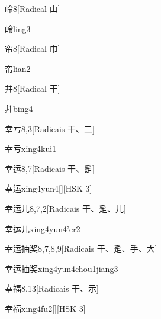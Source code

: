 \begin{entry}{岭}{8}[Radical ⼭]
  \begin{phonetics}{岭}{ling3}
  \end{phonetics}
\end{entry}

\begin{entry}{帘}{8}[Radical ⼱]
  \begin{phonetics}{帘}{lian2}
  \end{phonetics}
\end{entry}

\begin{entry}{幷}{8}[Radical ⼲]
  \begin{phonetics}{幷}{bing4}
  \end{phonetics}
\end{entry}

\begin{entry}{幸亏}{8,3}[Radicais ⼲、⼆]
  \begin{phonetics}{幸亏}{xing4kui1}
  \end{phonetics}
\end{entry}

\begin{entry}{幸运}{8,7}[Radicais ⼲、⾡]
  \begin{phonetics}{幸运}{xing4yun4}[][HSK 3]
  \end{phonetics}
\end{entry}

\begin{entry}{幸运儿}{8,7,2}[Radicais ⼲、⾡、⼉]
  \begin{phonetics}{幸运儿}{xing4yun4'er2}
  \end{phonetics}
\end{entry}

\begin{entry}{幸运抽奖}{8,7,8,9}[Radicais ⼲、⾡、⼿、⼤]
  \begin{phonetics}{幸运抽奖}{xing4yun4chou1jiang3}
  \end{phonetics}
\end{entry}

\begin{entry}{幸福}{8,13}[Radicais ⼲、⽰]
  \begin{phonetics}{幸福}{xing4fu2}[][HSK 3]
  \end{phonetics}
\end{entry}

